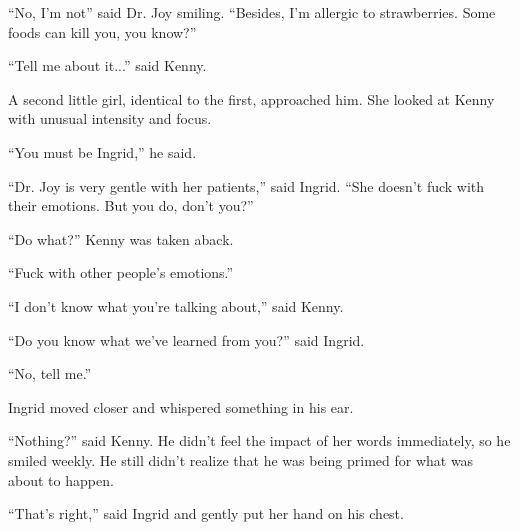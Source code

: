 \documentclass{memoir}
\begin{document}
``No, I'm not'' said Dr. Joy smiling. ``Besides, I'm allergic to strawberries. Some foods can kill you, you know?''

``Tell me about it...'' said Kenny.

A second little girl, identical to the first, approached him. She looked at Kenny with unusual intensity and focus.

``You must be Ingrid,'' he said.

``Dr. Joy is very gentle with her patients,'' said Ingrid. ``She doesn't fuck with their emotions. But you do, don't you?''

``Do what?'' Kenny was taken aback.

``Fuck with other people's emotions.''

``I don't know what you're talking about,'' said Kenny.

``Do you know what we've learned from you?'' said Ingrid. 

``No, tell me.''

Ingrid moved closer and whispered something in his ear. 

``Nothing?'' said Kenny. He didn't feel the impact of her words immediately, so he smiled weekly. He still didn't realize that he was being primed for what was about to happen.

``That's right,'' said Ingrid and gently put her hand on his chest. 
\end{document}
